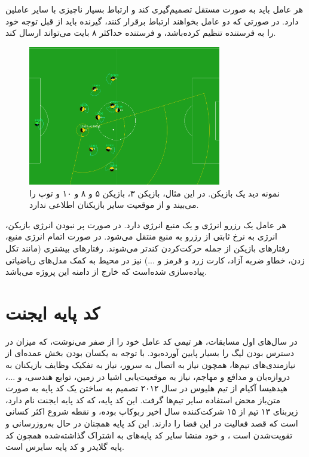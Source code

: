 هر عامل باید به صورت مستقل تصمیم‌گیری کند و ارتباط بسیار ناچیزی با سایر عاملین دارد.
در صورتی که دو عامل بخواهند ارتباط برقرار کنند، گیرنده باید از قبل توجه خود را به فرستنده تنظیم کرده‌باشد، و فرستنده حداکثر ۸ بایت می‌تواند ارسال کند.

\begin{figure}[H]
\centering
\includegraphics[width=0.75\textwidth]{images/view.png}
\caption{نمونه دید یک بازیکن. در این مثال، بازیکن ۳، بازیکن ۵ و ۸ و ۱۰ و توپ را می‌بیند و از موقعیت سایر بازیکنان اطلاعی ندارد.}\label{fig:view}
    
\end{figure}

هر عامل یک رزرو انرژی و یک منبع انرژی دارد. در صورت پر نبودن انرژی بازیکن، انرژی به نرخ ثابتی از رزرو به منبع منتقل می‌شود.
در صورت اتمام انرژی منبع، رفتار‌های بازیکن از جمله حرکت‌کردن کند‌تر می‌شوند.
رفتار‌های بیشتری (مانند تکل زدن، خطاو ضربه‌ آزاد، کارت زرد و قرمز و ...) 
نیز در محیط به کمک مدل‌های ریاضیاتی پیاده‌سازی شده‌است که خارج از دامنه این پروژه می‌باشد.

\section{کد پایه ایجنت}
در سال‌های اول مسابقات، هر تیمی کد عامل خود را از صفر می‌نوشت، که میزان در دسترس بودن لیگ را بسیار پایین آورده‌بود. با توجه به یکسان بودن بخش عمده‌ای از نیازمندی‌های تیم‌ها،
همچون نیاز به اتصال به سرور، نیاز به تفکیک وظایف بازیکنان به دروازه‌بان و مدافع و مهاجم، نیاز به موقعیت‌یابی اشیا در زمین، توابع هندسی، و ...، هیدهیسا آکیام از تیم هلیوس در سال ۲۰۱۲ تصمیم به ساختن یک کد پایه به صورت متن‌باز محض استفاده سایر تیم‌ها گرفت.
این کد پایه، که کد پایه ایجنت نام دارد، زیربنای ۱۳ تیم از ۱۵ شرکت‌کننده سال اخیر ربوکاپ بوده، و نقطه شروع اکثر کسانی است که قصد فعالیت در این فضا را دارند.
این کد پایه همچنان در حال به‌روز‌رسانی و تقویت‌شدن است
، و خود منشا سایر کد پایه‌های به اشتراک گذاشته‌شده همچون کد پایه گلایدر و کد پایه سایرس است.

